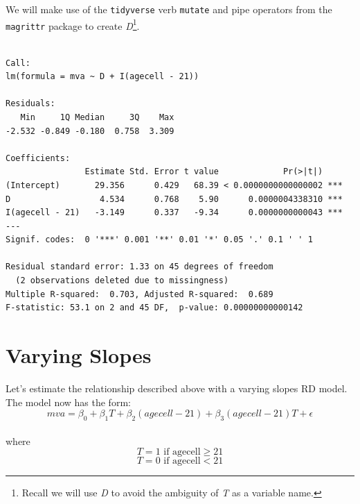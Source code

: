 \documentclass[]{book}
\newenvironment{Shaded}{\begin{snugshade}}{\end{snugshade}}
\newcommand{\DataTypeTok}[1]{\textcolor[rgb]{0.13,0.29,0.53}{#1}}
\newcommand{\DecValTok}[1]{\textcolor[rgb]{0.00,0.00,0.81}{#1}}
\newcommand{\KeywordTok}[1]{\textcolor[rgb]{0.13,0.29,0.53}{\textbf{#1}}}
\newcommand{\NormalTok}[1]{#1}
\newcommand{\OperatorTok}[1]{\textcolor[rgb]{0.81,0.36,0.00}{\textbf{#1}}}
\newcommand{\StringTok}[1]{\textcolor[rgb]{0.31,0.60,0.02}{#1}}
\let\rmarkdownfootnote\footnote%
\def\footnote{\protect\rmarkdownfootnote}
\begin{document}
We will make use of the \texttt{tidyverse} verb \texttt{mutate} and pipe operators from the \texttt{magrittr} package to create \emph{D}\footnote{Recall we will use \emph{D} to avoid the ambiguity of \emph{T} as a variable name.}.

\begin{Shaded}
\end{Shaded}

\begin{verbatim}

Call:
lm(formula = mva ~ D + I(agecell - 21))

Residuals:
   Min     1Q Median     3Q    Max 
-2.532 -0.849 -0.180  0.758  3.309 

Coefficients:
                Estimate Std. Error t value             Pr(>|t|)    
(Intercept)       29.356      0.429   68.39 < 0.0000000000000002 ***
D                  4.534      0.768    5.90      0.0000004338310 ***
I(agecell - 21)   -3.149      0.337   -9.34      0.0000000000043 ***
---
Signif. codes:  0 '***' 0.001 '**' 0.01 '*' 0.05 '.' 0.1 ' ' 1

Residual standard error: 1.33 on 45 degrees of freedom
  (2 observations deleted due to missingness)
Multiple R-squared:  0.703, Adjusted R-squared:  0.689 
F-statistic: 53.1 on 2 and 45 DF,  p-value: 0.00000000000142
\end{verbatim}

\hypertarget{varying-slopes}{%
\section{Varying Slopes}\label{varying-slopes}}

Let's estimate the relationship described above with a varying slopes RD model. The model now has the form: \[mva = \beta_0+\beta_1T+\beta_2(agecell-21)+\beta_3(agecell-21)T+\epsilon\]\\
where\\
\[T = 1 \text{ if agecell}\geq21\] \[T = 0 \text{ if agecell}<21\]
\end{document}
